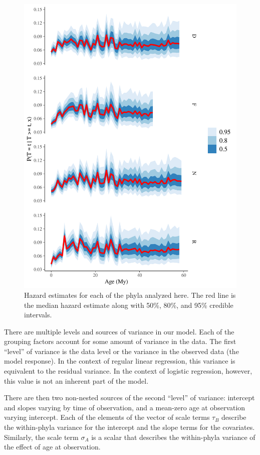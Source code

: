 \documentclass[12pt,letterpaper]{article}
\begin{document}
\begin{figure}[ht]
  \centering
  \includegraphics[width=\textwidth,height=0.5\textheight,keepaspectratio=true]{../results/figure/hazard_bygroup}
  \caption{Hazard estimates for each of the phyla analyzed here. The red line is the median hazard estimate along with 50\%, 80\%, and 95\% credible intervals.}
  \label{fig:hazard_bygroup}
\end{figure}


There are multiple levels and sources of variance in our model. Each of the grouping factors account for some amount of variance in the data. The first ``level'' of variance is the data level or the variance in the observed data (the model response). In the context of regular linear regression, this variance is equivalent to the residual variance. In the context of logistic regression, however, this value is not an inherent part of the model.

There are then two non-nested sources of the second ``level'' of variance: intercept and slopes varying by time of observation, and a mean-zero age at observation varying intercept. Each of the elements of the vector of scale terms \(\tau_{B}\) describe the within-phyla variance for the intercept and the slope terms for the covariates. Similarly, the scale term \(\sigma_{A}\) is a scalar that describes the within-phyla variance of the effect of age at observation. 
\end{document}
